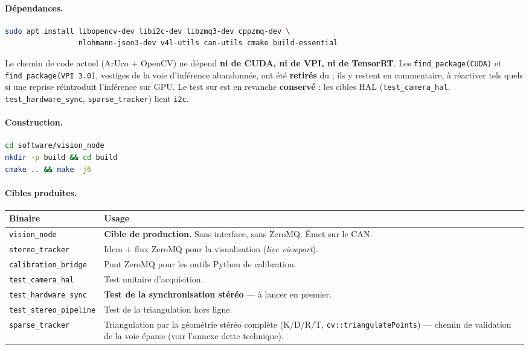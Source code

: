 \documentclass[11pt,a4paper]{article}
\begin{document}
\paragraph{Dépendances.}
\begin{lstlisting}[language=bash]
sudo apt install libopencv-dev libi2c-dev libzmq3-dev cppzmq-dev \
                 nlohmann-json3-dev v4l-utils can-utils cmake build-essential
\end{lstlisting}

\begin{note}
Le chemin de code actuel (ArUco + OpenCV) ne dépend \textbf{ni de CUDA, ni de VPI, ni de
TensorRT}. Les \texttt{find\_package(CUDA)} et \texttt{find\_package(VPI 3.0)}, vestiges de
la voie d'inférence abandonnée, ont été \textbf{retirés} du \fichier{CMakeLists.txt} ; ils y
restent en commentaire, à réactiver tels quels si une reprise réintroduit l'inférence sur
GPU. Le test sur \fichier{i2c/smbus.h} est en revanche \textbf{conservé} : les cibles HAL
(\texttt{test\_camera\_hal}, \texttt{test\_hardware\_sync}, \texttt{sparse\_tracker})
lient \texttt{i2c}.
\end{note}

\paragraph{Construction.}
\begin{lstlisting}[language=bash]
cd software/vision_node
mkdir -p build && cd build
cmake .. && make -j6
\end{lstlisting}

\paragraph{Cibles produites.}
\begin{center}
\begin{tabularx}{\textwidth}{@{}lX@{}}
\toprule
\textbf{Binaire} & \textbf{Usage} \\
\midrule
\texttt{vision\_node} & \textbf{Cible de production.} Sans interface, sans ZeroMQ. Émet sur le CAN. \\
\texttt{stereo\_tracker} & Idem + flux ZeroMQ pour la visualisation (\emph{live viewport}). \\
\texttt{calibration\_bridge} & Pont ZeroMQ pour les outils Python de calibration. \\
\texttt{test\_camera\_hal} & Test unitaire d'acquisition. \\
\texttt{test\_hardware\_sync} & \textbf{Test de la synchronisation stéréo} — à lancer en premier. \\
\texttt{test\_stereo\_pipeline} & Test de la triangulation hors ligne. \\
\texttt{sparse\_tracker} & Triangulation par la géométrie stéréo complète (K/D/R/T,
\texttt{cv::triangulatePoints}) — chemin de validation de la voie éparse (voir l'annexe
dette technique). \\
\bottomrule
\end{tabularx}
\end{center}
\end{document}
